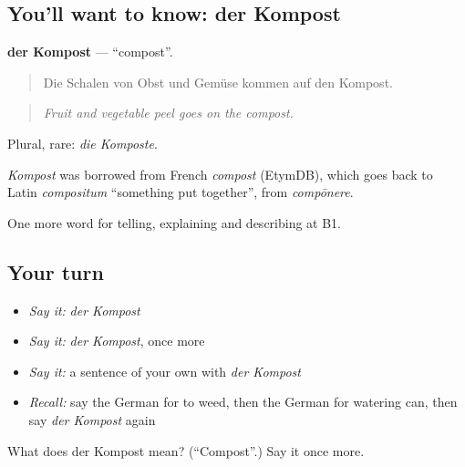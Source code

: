 \subsection*{You'll want to know: der Kompost}
\textbf{der Kompost} — \textquotedblleft{}compost\textquotedblright{}.

\begin{quote}
Die Schalen von Obst und Gemüse kommen auf den Kompost.
\end{quote}

\begin{quote}
\emph{Fruit and vegetable peel goes on the compost.}
\end{quote}

Plural, rare: \emph{die Komposte}.

\begin{cousinweb}
\emph{Kompost} was borrowed from French \emph{compost} (EtymDB), which goes back to Latin \emph{compositum} \textquotedblleft{}something put together\textquotedblright{}, from \emph{compōnere}.
\end{cousinweb}

\begin{grammarlens}[title={What you've built}]
One more word for telling, explaining and describing at B1.
\end{grammarlens}

\subsection*{Your turn}
\begin{itemize}
\raggedright
  \item \emph{Say it:} \emph{der Kompost}
  \item \emph{Say it:} \emph{der Kompost}, once more
  \item \emph{Say it:} a sentence of your own with \emph{der Kompost}
  \item \emph{Recall:} say the German for to weed, then the German for watering can, then say \emph{der Kompost} again
\end{itemize}

\begin{tcolorbox}[breakable,colback=teal!4,colframe=teal!35!black,title={Before you move on}]
What does der Kompost mean? (\textquotedblleft{}Compost\textquotedblright{}.) Say it once more.
\end{tcolorbox}
